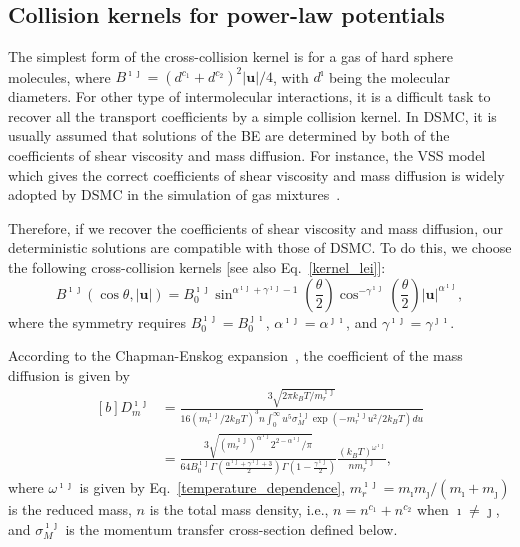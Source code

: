 \subsection{Collision kernels for power-law potentials}

The simplest form of the cross-collision kernel is for a gas of hard sphere molecules, where  $B^{\imath\jmath}=(d^{c_1}+d^{c_2})^2|\textbf{u}|/4$, with $d^\imath$ being the molecular diameters. For other type of intermolecular interactions, it is a difficult task to recover all the transport coefficients by a simple collision kernel. In DSMC, it is usually assumed that solutions of the BE are determined by both of the coefficients of shear viscosity and mass diffusion. For instance, the VSS model which gives the correct coefficients of shear viscosity and mass diffusion is widely adopted by DSMC in the simulation of gas mixtures~\cite{Bird1994}. 

Therefore, if we recover the coefficients of shear viscosity and mass diffusion, our deterministic solutions are compatible with those of DSMC. To do this, we choose the following cross-collision kernels [see also Eq.~\eqref{kernel_lei}]:
\begin{equation}\label{kernel_double}
    B^{\imath\jmath}(\cos\theta,|\textbf{u}|)=B_0^{\imath\jmath}\sin^{\alpha^{\imath\jmath}+\gamma^{\imath\jmath}-1}
    \left(\frac{\theta}{2}\right)\cos^{-\gamma^{\imath\jmath}}\left(\frac{\theta}{2}\right)|\textbf{u}|^{\alpha^{\imath\jmath}},
\end{equation}
where the symmetry requires $B_0^{\imath\jmath}=B_0^{\jmath\imath}$, $\alpha^{\imath\jmath}=\alpha^{\jmath\imath}$, and $\gamma^{\imath\jmath}=\gamma^{\jmath\imath}$. 


According to the Chapman-Enskog expansion~\cite{CE}, the coefficient of the mass diffusion is given by 
\begin{equation}\label{dv}
\begin{aligned}[b]
    D^{\imath\jmath}_m&=\frac{3\sqrt{{2\pi}k_BT/{m_r^{\imath\jmath}}}}{16({m_r^{\imath\jmath}}/{2k_BT})^3n\int_0^\infty
    u^5\sigma_M^{\imath\jmath}\exp\left(-{m_r^{\imath\jmath}{}u^2}/{2k_BT}\right)du}\\
    &=\frac{3\sqrt{{(m_r^{\imath\jmath})^{\alpha^{\imath\jmath}}}2^{2-\alpha^{\imath\jmath}}/\pi }}
    {64B_0^{\imath\jmath} \Gamma(\frac{\alpha^{\imath\jmath}
    +\gamma^{\imath\jmath}+3}{2})\Gamma(1-\frac{\gamma^{\imath\jmath}}{2})}
    \frac{(k_BT)^{\omega^{\imath\jmath}}}{nm_r^{\imath\jmath}},
\end{aligned}
\end{equation}
where $\omega^{\imath\jmath}$ is given by  Eq.~\eqref{temperature_dependence}, $m_r^{\imath\jmath}={m_\imath{}m_\jmath}/(m_\imath+m_\jmath)$
is the reduced mass, $n$ is the total mass density, i.e., $n=n^{c_1}+n^{c_2}$ when 
$\imath\neq\jmath$, and $\sigma_M^{\imath\jmath}$ is the momentum transfer cross-section defined below.

